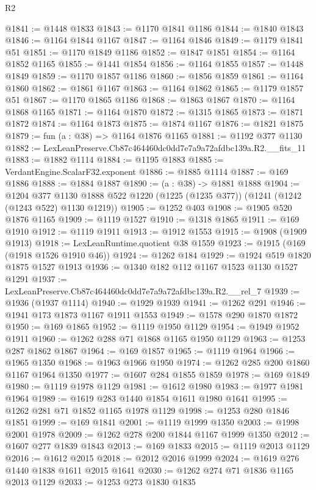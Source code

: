 \begin{lexlean}{R2}
\begin{coremodule}
@1841 := @1448 @1833
@1843 := @1170 @1841 @1186
@1844 := @1840 @1843
@1846 := @1164 @1844 @1167
@1847 := @1164 @1846
@1849 := @1179 @1841 @51
@1851 := @1170 @1849 @1186
@1852 := @1847 @1851
@1854 := @1164 @1852 @1165
@1855 := @1441 @1854
@1856 := @1164 @1855
@1857 := @1448 @1849
@1859 := @1170 @1857 @1186
@1860 := @1856 @1859
@1861 := @1164 @1860
@1862 := @1861 @1167
@1863 := @1164 @1862
@1865 := @1179 @1857 @51
@1867 := @1170 @1865 @1186
@1868 := @1863 @1867
@1870 := @1164 @1868 @1165
@1871 := @1164 @1870
@1872 := @1315 @1865
@1873 := @1871 @1872
@1874 := @1164 @1873
@1875 := @1874 @1167
@1876 := @1821 @1875
@1879 := fun (a : @38) => @1164 @1876 @1165
@1881 := @1192 @377 @1130
@1882 := LexLeanPreserve.Cb87c464460dc0dd7e7a9a72afdbc139a.R2.__fits_11
@1883 := @1882 @1114
@1884 := @1195 @1883
@1885 := VerdantEngine.ScalarF32.exponent
@1886 := @1885 @1114
@1887 := @169 @1886
@1888 := @1884 @1887
@1890 := (a : @38) -> @1881 @1888
@1904 := @1204
    @377
    @1130
    @1888
    @522
    @1220
    (@1225 (@1235 @377))
    (@1241 (@1242 (@1243 @522) @1130 @1219))
@1905 := @1252 @403
@1908 := @1905 @520 @1876 @1165
@1909 := @1119 @1527
@1910 := @1318 @1865
@1911 := @169 @1910
@1912 := @1119 @1911
@1913 := @1912 @1553
@1915 := @1908 (@1909 @1913)
@1918 := LexLeanRuntime.quotient @38 @1559
@1923 := @1915 (@169 (@1918 @1526 @1910 @46))
@1924 := @1262 @184
@1929 := @1924 @519 @1820 @1875 @1527 @1913
@1936 := @1340 @182 @112 @1167 @1523 @1130 @1527 @1291
@1937 := LexLeanPreserve.Cb87c464460dc0dd7e7a9a72afdbc139a.R2.__rel_7
@1939 := @1936 (@1937 @1114)
@1940 := @1929 @1939
@1941 := @1262 @291
@1946 := @1941 @173 @1873 @1167 @1911 @1553
@1949 := @1578 @290 @1870 @1872
@1950 := @169 @1865
@1952 := @1119 @1950 @1129
@1954 := @1949 @1952 @1911
@1960 := @1262 @288 @71 @1868 @1165 @1950 @1129
@1963 := @1253 @287 @1862 @1867
@1964 := @169 @1857
@1965 := @1119 @1964
@1966 := @1965 @1350
@1968 := @1963 @1966 @1950
@1974 := @1262 @285 @200 @1860 @1167 @1964 @1350
@1977 := @1607 @284 @1855 @1859
@1978 := @169 @1849
@1980 := @1119 @1978 @1129
@1981 := @1612 @1980
@1983 := @1977 @1981 @1964
@1989 := @1619 @283 @1440 @1854 @1611 @1980 @1641
@1995 := @1262 @281 @71 @1852 @1165 @1978 @1129
@1998 := @1253 @280 @1846 @1851
@1999 := @169 @1841
@2001 := @1119 @1999 @1350
@2003 := @1998 @2001 @1978
@2009 := @1262 @278 @200 @1844 @1167 @1999 @1350
@2012 := @1607 @277 @1839 @1843
@2013 := @169 @1833
@2015 := @1119 @2013 @1129
@2016 := @1612 @2015
@2018 := @2012 @2016 @1999
@2024 := @1619 @276 @1440 @1838 @1611 @2015 @1641
@2030 := @1262 @274 @71 @1836 @1165 @2013 @1129
@2033 := @1253 @273 @1830 @1835

\end{coremodule}
\end{lexlean}
